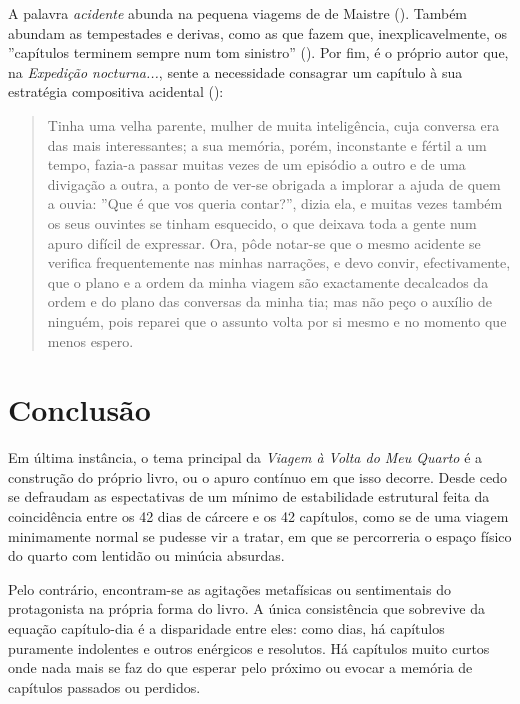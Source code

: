 \documentclass[12pt]{article}
\newenvironment{citacao}
{\begin{quote}
    \begin{small}
      \itshape
      \linespread{1}
}
{\end{small}\end{quote}}
\begin{document}
A palavra \emph{acidente} abunda na pequena viagems de de Maistre
(\cite[p.71, p.115, p.139, p.182, p.191, p.195,
  p. 205]{demaistre}). Também abundam as tempestades e derivas, como
as que fazem que, inexplicavelmente, os ''capítulos terminem sempre
num tom sinistro'' (\cite[p.61]{demaistre}). Por fim, é o próprio
autor que, na \emph{Expedição nocturna...}, sente a necessidade
consagrar um capítulo à sua estratégia compositiva acidental
(\cite[p.182]{demaistre}):

\singlespacing

\begin{citacao}
  Tinha uma velha parente, mulher de muita inteligência, cuja conversa
  era das mais interessantes; a sua memória, porém, inconstante e
  fértil a um tempo, fazia-a passar muitas vezes de um episódio a
  outro e de uma divigação a outra, a ponto de ver-se obrigada a
  implorar a ajuda de quem a ouvia: ''Que é que vos queria contar?'',
  dizia ela, e muitas vezes também os seus ouvintes se tinham
  esquecido, o que deixava toda a gente num apuro difícil de
  expressar. Ora, pôde notar-se que o mesmo acidente se verifica
  frequentemente nas minhas narrações, e devo convir, efectivamente,
  que o plano e a ordem da minha viagem são exactamente decalcados da
  ordem e do plano das conversas da minha tia; mas não peço o auxílio
  de ninguém, pois reparei que o assunto volta por si mesmo e no
  momento que menos espero.
\end{citacao}

\doublespacing

\section{Conclusão}

Em última instância, o tema principal da \emph{Viagem à Volta do Meu
  Quarto} é a construção do próprio livro, ou o apuro contínuo em que
isso decorre. Desde cedo se defraudam as espectativas de um mínimo de
estabilidade estrutural feita da coincidência entre os 42 dias de
cárcere e os 42 capítulos, como se de uma viagem minimamente normal se
pudesse vir a tratar, em que se percorreria o espaço físico do quarto
com lentidão ou minúcia absurdas.

Pelo contrário, encontram-se as agitações metafísicas ou sentimentais
do protagonista na própria forma do livro. A única consistência que
sobrevive da equação capítulo-dia é a disparidade entre eles: como
dias, há capítulos puramente indolentes e outros enérgicos e
resolutos. Há capítulos muito curtos onde nada mais se faz do que
esperar pelo próximo ou evocar a memória de capítulos passados ou
perdidos.
\end{document}
